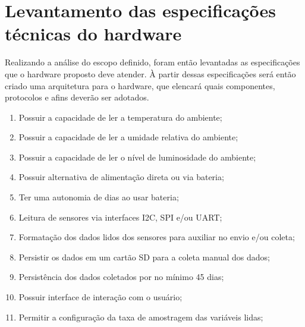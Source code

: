\section{Levantamento das especificações técnicas do hardware}

Realizando a análise do escopo definido, foram então levantadas as especificações que o hardware proposto deve atender. À partir dessas especificações será então criado uma arquitetura para o hardware, que elencará quais componentes, protocolos e afins deverão ser adotados.

    \begin{enumerate}
        \item Possuir a capacidade de ler a temperatura do ambiente;
        \item Possuir a capacidade de ler a umidade relativa do ambiente;
        \item Possuir a capacidade de ler o nível de luminosidade do ambiente;
        \item Possuir alternativa de alimentação direta ou via bateria;
        \item Ter uma autonomia de dias ao usar bateria;
        \item Leitura de sensores via interfaces I2C, SPI e/ou UART;
        \item Formatação dos dados lidos dos sensores para auxiliar no envio e/ou coleta;
        \item Persistir os dados em um cartão SD para a coleta manual dos dados;
        \item Persistência dos dados coletados por no mínimo 45 dias;
        \item Possuir interface de interação com o usuário;
        \item Permitir a configuração da taxa de amostragem das variáveis lidas;

\end{enumerate}
